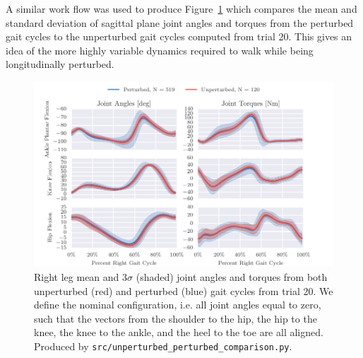 \documentclass[fleqn,12pt]{wlpeerj}
\begin{document}
A similar work flow was used to produce
Figure~\ref{fig:angle-torque-comparison} which compares the mean and standard
deviation of sagittal plane joint angles and torques from the perturbed gait
cycles to the unperturbed gait cycles computed from trial 20. This gives an
idea of the more highly variable dynamics required to walk while being
longitudinally perturbed.
%
\begin{figure}
  \centering
  \includegraphics{figures/unperturbed-perturbed-comparison.pdf}
  \cprotect\caption{Right leg mean and $3\sigma$ (shaded) joint angles and
    torques from both unperturbed (red) and perturbed (blue) gait cycles
    from trial 20. We define the nominal configuration, i.e. all joint angles
    equal to zero, such that the vectors from the shoulder to the hip, the hip
    to the knee, the knee to the ankle, and the heel to the toe are all aligned.
    Produced by \verb|src/unperturbed_perturbed_comparison.py|.}
  \label{fig:angle-torque-comparison}
\end{figure}
\end{document}
